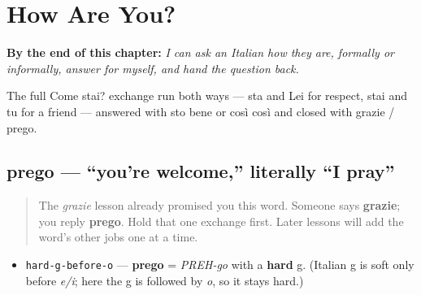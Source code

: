 
\chapter{How Are You?}
\label{ch:it-how-are-you}

\begin{chapteropening}
\textbf{By the end of this chapter:} \emph{I can ask an Italian how they are, formally or informally, answer for myself, and hand the question back.}

The full Come stai? exchange run both ways — sta and Lei for respect, stai and tu for a friend — answered with sto bene or così così and closed with grazie / prego.
\end{chapteropening}

\section[prego]{prego — \textquotedblleft{}you're welcome,\textquotedblright{} literally \textquotedblleft{}I pray\textquotedblright{}}

\label{lesson:IT-C02-prego}



\begin{quote}
The \emph{grazie} lesson already promised you this word. Someone says \textbf{grazie}; you reply \textbf{prego}. Hold that one exchange first. Later lessons will add the word's other jobs one at a time.
\end{quote}

\begin{sounds}
\begin{itemize}
\raggedright
  \item \texttt{hard-g-before-o} — \textbf{prego} = \emph{PREH-go} with a \textbf{hard} g. (Italian g is soft only before \emph{e/i}; here the g is followed by \emph{o}, so it stays hard.)
\end{itemize}
\end{sounds}

